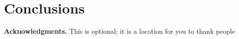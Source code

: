 \documentclass{mpaper}
\begin{document}
\section{Conclusions}


\vskip8pt \noindent
{\bf Acknowledgments.}
This is optional; it is a location for you to thank people



\end{document}
